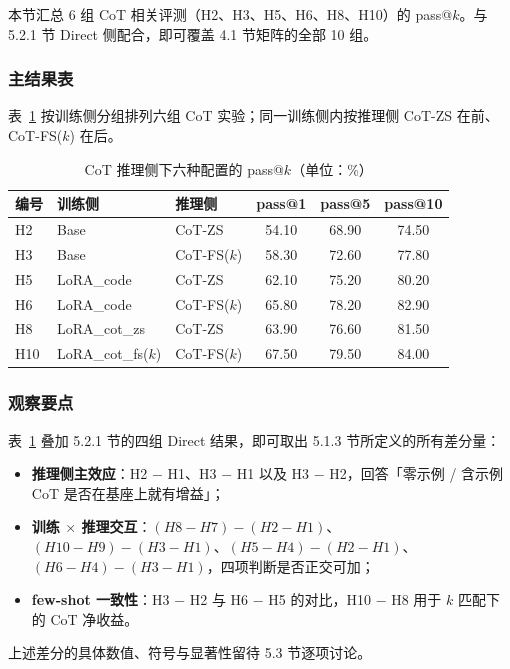 
本节汇总 6 组 CoT 相关评测（H2、H3、H5、H6、H8、H10）的 pass@$k$。与 5.2.1 节 Direct 侧配合，即可覆盖 4.1 节矩阵的全部 10 组。

\subsubsection{主结果表}
表~\ref{tab:ch5-cot} 按训练侧分组排列六组 CoT 实验；同一训练侧内按推理侧 CoT-ZS 在前、CoT-FS($k$) 在后。

\begin{table}[!htb]
  \centering
  \caption{CoT 推理侧下六种配置的 pass@$k$（单位：\%）}
  \label{tab:ch5-cot}
  \footnotesize
  \begin{tabular}{lllccc}
    \toprule
    编号 & 训练侧 & 推理侧 & pass@1 & pass@5 & pass@10 \\
    \midrule
    H2  & Base               & CoT-ZS      & 54.10 & 68.90 & 74.50 \\
    H3  & Base               & CoT-FS($k$) & 58.30 & 72.60 & 77.80 \\
    \midrule
    H5  & LoRA\_code         & CoT-ZS      & 62.10 & 75.20 & 80.20 \\
    H6  & LoRA\_code         & CoT-FS($k$) & 65.80 & 78.20 & 82.90 \\
    \midrule
    H8  & LoRA\_cot\_zs      & CoT-ZS      & 63.90 & 76.60 & 81.50 \\
    H10 & LoRA\_cot\_fs($k$) & CoT-FS($k$) & 67.50 & 79.50 & 84.00 \\
    \bottomrule
  \end{tabular}
\end{table}

\subsubsection{观察要点}
表~\ref{tab:ch5-cot} 叠加 5.2.1 节的四组 Direct 结果，即可取出 5.1.3 节所定义的所有差分量：
\begin{itemize}
    \item \textbf{推理侧主效应}：H2 − H1、H3 − H1 以及 H3 − H2，回答「零示例 / 含示例 CoT 是否在基座上就有增益」；
    \item \textbf{训练 $\times$ 推理交互}：$(H8 - H7) - (H2 - H1)$、$(H10 - H9) - (H3 - H1)$、$(H5 - H4) - (H2 - H1)$、$(H6 - H4) - (H3 - H1)$，四项判断是否正交可加；
    \item \textbf{few-shot 一致性}：H3 − H2 与 H6 − H5 的对比，H10 − H8 用于 $k$ 匹配下的 CoT 净收益。
\end{itemize}
上述差分的具体数值、符号与显著性留待 5.3 节逐项讨论。

